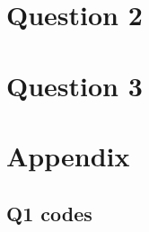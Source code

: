 \documentclass{article}
\begin{document}
\section{Question 2}

\section{Question 3}


\section{Appendix}

\subsection{Q1 codes}
\end{document}
